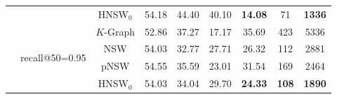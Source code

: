 \documentclass[11pt]{article}
\begin{document}
\begin{table}[t]
\begin{tabular}{ccccccccc}
                     &          & HNSW$_0$ & 54.18 & 44.40 & 40.10 & \textbf{14.08}   & 71     & \textbf{1336} \\\cmidrule{2-9}
                                            & \multirow{4}{*}[-3mm]{recall@50=0.95} & $K$-Graph & 52.86 & 37.27 & 17.17 & 35.69 & 423 & 5336 \\\cmidrule{3-9}
                     &          & NSW      & 54.03 & 32.77 & 27.71 & 26.32   & 112    & 2881 \\\cmidrule{3-9}
                     &          & pNSW     & 54.55 & 35.59 & 23.01 & 31.54   & 169    & 2464 \\\cmidrule{3-9}
                     &          & HNSW$_0$ & 54.03 & 34.04 & 29.70 & \textbf{24.33}   & \textbf{108}    & \textbf{1890}\\\bottomrule
\end{tabular}
\end{table}
\end{document}
